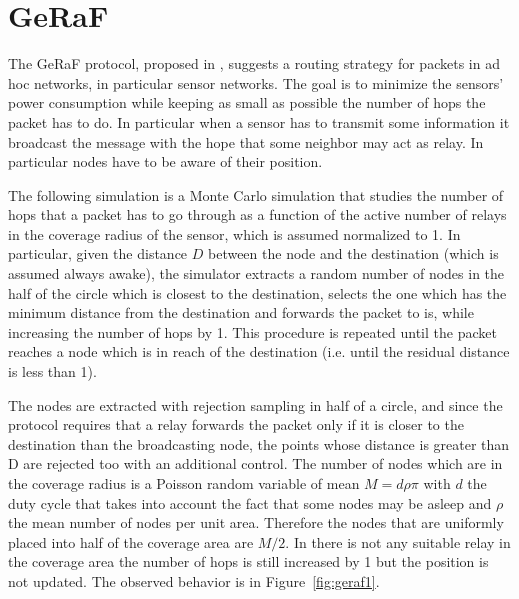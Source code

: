 \documentclass[10pt]{article}
\begin{document}
\FloatBarrier

\section*{GeRaF}
The GeRaF protocol, proposed in \cite{tmc}, suggests a routing strategy for packets in ad hoc networks, in particular sensor networks. The goal is to minimize the sensors' power consumption while keeping as small as possible the number of hops the packet has to do. In particular when a sensor has to transmit some information it broadcast the message with the hope that some neighbor may act as relay. In particular nodes have to be aware of their position. 

The following simulation is a Monte Carlo simulation that studies the number of hops that a packet has to go through as a function of the active number of relays in the coverage radius of the sensor, which is assumed normalized to 1. In particular, given the distance $D$ between the node and the destination (which is assumed always awake), the simulator extracts a random number of nodes in the half of the circle which is closest to the destination, selects the one which has the minimum distance from the destination and forwards the packet to is, while increasing the number of hops by 1. This procedure is repeated until the packet reaches a node which is in reach of the destination (i.e. until the residual distance is less than 1). 

The nodes are extracted with rejection sampling in half of a circle, and since the protocol requires that a relay forwards the packet only if it is closer to the destination than the broadcasting node, the points whose distance is greater than D are rejected too with an additional control. The number of nodes which are in the coverage radius is a Poisson random variable of mean $M = d \rho \pi$ with $d$ the duty cycle that takes into account the fact that some nodes may be asleep and $\rho$ the mean number of nodes per unit area. Therefore the nodes that are uniformly placed into half of the coverage area are $M/2$. In there is not any suitable relay in the coverage area the number of hops is still increased by 1 but the position is not updated. The observed behavior is in Figure~\ref{fig:geraf1}.
\end{document}
